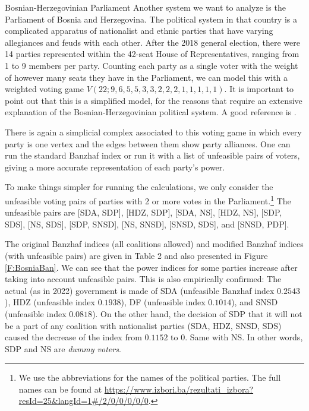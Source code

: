 \documentclass[11pt]{amsart}
\newcommand{\ifn}[1]{\footnote{{\bf Ismar: }#1}} %
\theoremstyle{plain}
\theoremstyle{definition}
\theoremstyle{remark}
\begin{document}
\begin{subsubsection}{Bosnian-Herzegovinian Parliament}\label{SSS:Bosnia}
Another system we want to analyze is the Parliament of Bosnia and Herzegovina. The political system in that country is a complicated apparatus of nationalist and ethnic parties that have varying allegiances and feuds with each other. After the 2018 general election, there were 14 parties represented within the 42-seat House of Representatives, ranging from 1 to 9 members per party. Counting each party as a single voter with the weight of however many seats they have in the Parliament, we can model this with a weighted voting game $V(22;9,6,5,5,3,3,2,2,2,1,1,1,1,1)$. It is important to point out that this is a simplified model, for the reasons that require an extensive explanation of the Bosnian-Herzegovinian political system. A good reference  is \cite{BGM21}.

There is again a simplicial complex associated to this voting game in which every party is one vertex and the edges between them show party alliances. One can run the standard Banzhaf index or run it with a list of unfeasible pairs of voters, giving a more accurate representation of each party's power.

To make things simpler for running the calculations, we only consider the unfeasible voting pairs of parties with 2 or more votes in the Parliament.\footnote{We use the abbreviations for the names of the political parties. The full names can be found at \url{https://www.izbori.ba/rezultati_izbora?resId=25&langId=1#/2/0/0/0/0/0}.} The unfeasible pairs  are [SDA, SDP], [HDZ, SDP], [SDA, NS], [HDZ, NS], [SDP, SDS], [NS, SDS], [SDP, SNSD], [NS, SNSD], [SNSD, SDS], and [SNSD, PDP]. 

The original Banzhaf indices (all coalitions allowed) and modified Banzhaf indices (with unfeasible pairs) are given in Table 2 and also presented in Figure \ref{F:BosniaBan}. We can see that the power indices for some parties increase after taking into account unfeasible pairs. This is also empirically confirmed: The actual (as in 2022) government is made of SDA (unfeasible Banzhaf index $0.2543$), HDZ (unfeasible index $0.1938$), DF (unfeasible index $0.1014$), and SNSD (unfeasible index $0.0818$). On the other hand, the decision of SDP that it will not be a part of any coalition with nationalist parties (SDA, HDZ, SNSD, SDS) caused the decrease of the index from $0.1152$ to $0$. Same with NS. In other words, SDP and NS are \emph{dummy voters}.


\end{subsubsection}
\end{document}
